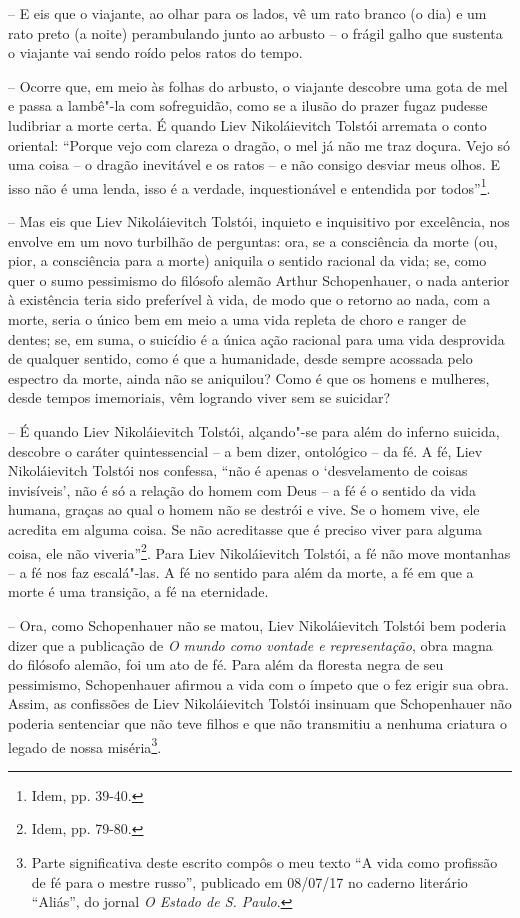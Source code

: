 -- E eis que o viajante, ao olhar para os lados, vê um rato branco (o
dia) e um rato preto (a noite) perambulando junto ao arbusto -- o frágil
galho que sustenta o viajante vai sendo roído pelos ratos do tempo.

-- Ocorre que, em meio às folhas do arbusto, o viajante descobre uma
gota de mel e passa a lambê"-la com sofreguidão, como se a ilusão do
prazer fugaz pudesse ludibriar a morte certa. É quando Liev
Nikoláievitch Tolstói arremata o conto oriental: ``Porque vejo com
clareza o dragão, o mel já não me traz doçura. Vejo só uma coisa -- o
dragão inevitável e os ratos -- e não consigo desviar meus olhos. E isso
não é uma lenda, isso é a verdade, inquestionável e entendida por
todos''\footnote{Idem, pp. 39-40.}.

-- Mas eis que Liev Nikoláievitch Tolstói, inquieto e inquisitivo por
excelência, nos envolve em um novo turbilhão de perguntas: ora, se a
consciência da morte (ou, pior, a consciência para a morte) aniquila o
sentido racional da vida; se, como quer o sumo pessimismo do filósofo
alemão Arthur Schopenhauer, o nada anterior à existência teria sido
preferível à vida, de modo que o retorno ao nada, com a morte, seria o
único bem em meio a uma vida repleta de choro e ranger de dentes; se, em
suma, o suicídio é a única ação racional para uma vida desprovida de
qualquer sentido, como é que a humanidade, desde sempre acossada pelo
espectro da morte, ainda não se aniquilou? Como é que os homens e
mulheres, desde tempos imemoriais, vêm logrando viver sem se suicidar?

-- É quando Liev Nikoláievitch Tolstói, alçando"-se para além do inferno
suicida, descobre o caráter quintessencial -- a bem dizer, ontológico --
da fé. A fé, Liev Nikoláievitch Tolstói nos confessa, ``não é apenas o
`desvelamento de coisas invisíveis', não é só a relação do homem com
Deus -- a fé é o sentido da vida humana, graças ao qual o homem não se
destrói e vive. Se o homem vive, ele acredita em alguma coisa. Se não
acreditasse que é preciso viver para alguma coisa, ele não
viveria''\footnote{Idem, pp. 79-80.}. Para Liev Nikoláievitch Tolstói, a
fé não move montanhas -- a fé nos faz escalá"-las. A fé no sentido para
além da morte, a fé em que a morte é uma transição, a fé na eternidade.

\pagebreak

-- Ora, como Schopenhauer não se matou, Liev Nikoláievitch Tolstói bem
poderia dizer que a publicação de \emph{O mundo como vontade e
representação}, obra magna do filósofo alemão, foi um ato de fé. Para
além da floresta negra de seu pessimismo, Schopenhauer afirmou a vida
com o ímpeto que o fez erigir sua obra. Assim, as confissões de Liev
Nikoláievitch Tolstói insinuam que Schopenhauer não poderia sentenciar
que não teve filhos e que não transmitiu a nenhuma criatura o legado de
nossa miséria\footnote{Parte significativa deste escrito compôs o meu
  texto ``A vida como profissão de fé para o mestre russo'', publicado
  em 08/07/17 no caderno literário ``Aliás'', do jornal \emph{O Estado
  de S. Paulo}.}.

